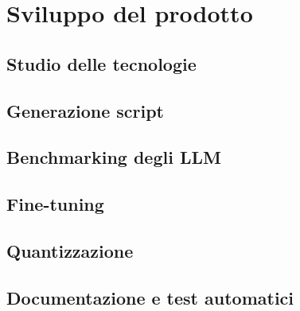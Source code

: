 \chapter{Sviluppo del prodotto}
\label{chap:sviluppo-del-prodotto}
\section{Studio delle tecnologie}
\section{Generazione script}
\section{Benchmarking degli LLM}
\section{Fine-tuning}
\section{Quantizzazione}
\section{Documentazione e test automatici}
\newpage